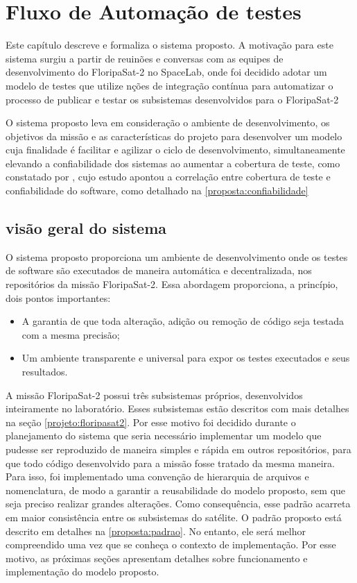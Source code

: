 \chapter{Fluxo de Automação de testes}
\label{chapter:proposta}
Este capítulo descreve e formaliza o sistema proposto. A motivação para este sistema surgiu a partir de reuinões e conversas com as equipes de desenvolvimento do FloripaSat-2 no SpaceLab, onde foi decidido adotar um modelo de testes que utilize nções de  integração contínua para automatizar o processo de publicar e testar os subsistemas desenvolvidos para o FloripaSat-2

O sistema proposto leva em consideração o ambiente de desenvolvimento, os objetivos da missão e as características do projeto para desenvolver um modelo cuja finalidade é facilitar e agilizar o ciclo de desenvolvimento, simultaneamente elevando a confiabilidade dos sistemas ao aumentar a cobertura de teste, como constatado por \cite{chen-2001}, cujo estudo apontou a correlação entre cobertura de teste e confiabilidade do software, como detalhado na \autoref{proposta:confiabilidade}


\section{visão geral do sistema}
\label{proposta:visao-geral}
O sistema proposto proporciona um ambiente de desenvolvimento onde os testes de software são executados de maneira automática e decentralizada, nos repositórios da missão FloripaSat-2. Essa abordagem proporciona, a princípio, dois pontos importantes:

\begin{itemize}
    \item A garantia de que toda alteração, adição ou remoção de código seja testada com a mesma precisão;
    \item Um ambiente transparente e universal para expor os testes executados e seus resultados.
\end{itemize}

A missão FloripaSat-2 possui três subsistemas próprios, desenvolvidos inteiramente no laboratório. Esses subsistemas estão descritos com mais detalhes na seção \ref{projeto:floripasat2}. Por esse motivo foi decidido durante o planejamento do sistema que seria necessário implementar um modelo que pudesse ser reproduzido de maneira simples e rápida em outros repositórios, para que todo código desenvolvido para a missão fosse tratado da mesma maneira. Para isso, foi implementado uma convenção de hierarquia de arquivos e nomenclatura, de modo a garantir a reusabilidade do modelo proposto, sem que seja preciso realizar grandes alterações. Como consequência, esse padrão acarreta em maior consistência entre os subsistemas do satélite. O padrão proposto está descrito em detalhes na \autoref{proposta:padrao}. No entanto, ele será melhor compreendido uma vez que se conheça o contexto de implementação. Por esse motivo, as próximas seções apresentam detalhes sobre funcionamento e implementação do modelo proposto.

